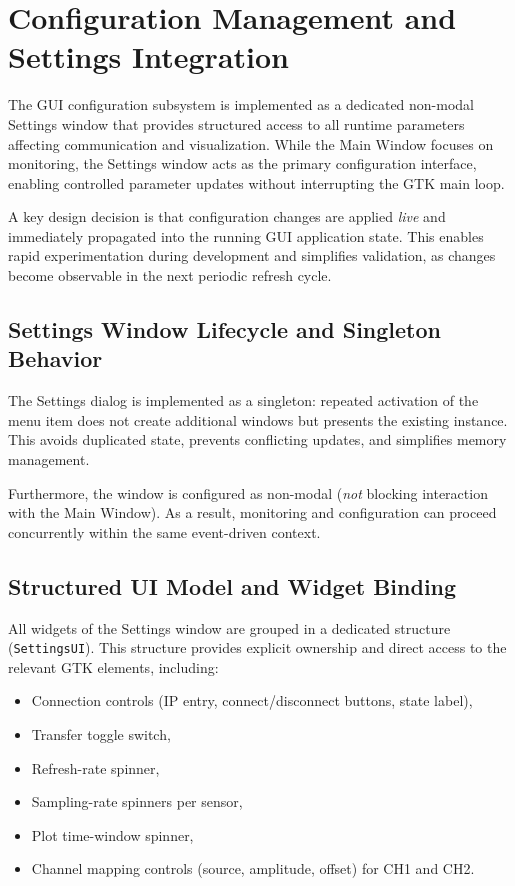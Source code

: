 \section{Configuration Management and Settings Integration}
\label{sec:gui_settings_integration}

The GUI configuration subsystem is implemented as a dedicated non-modal Settings window that provides structured access to all runtime parameters affecting communication and visualization. While the Main Window focuses on monitoring, the Settings window acts as the primary configuration interface, enabling controlled parameter updates without interrupting the GTK main loop.

A key design decision is that configuration changes are applied \emph{live} and immediately propagated into the running GUI application state. This enables rapid experimentation during development and simplifies validation, as changes become observable in the next periodic refresh cycle.

\subsection{Settings Window Lifecycle and Singleton Behavior}
\label{sec:gui_settings_singleton}

The Settings dialog is implemented as a singleton: repeated activation of the menu item does not create additional windows but presents the existing instance. This avoids duplicated state, prevents conflicting updates, and simplifies memory management.

Furthermore, the window is configured as non-modal (\emph{not} blocking interaction with the Main Window). As a result, monitoring and configuration can proceed concurrently within the same event-driven context.

\subsection{Structured UI Model and Widget Binding}
\label{sec:gui_settings_ui_model}

All widgets of the Settings window are grouped in a dedicated structure (\texttt{SettingsUI}). This structure provides explicit ownership and direct access to the relevant GTK elements, including:

\begin{itemize}
	\item Connection controls (IP entry, connect/disconnect buttons, state label),
	\item Transfer toggle switch,
	\item Refresh-rate spinner,
	\item Sampling-rate spinners per sensor,
	\item Plot time-window spinner,
	\item Channel mapping controls (source, amplitude, offset) for CH1 and CH2.
\end{itemize}

